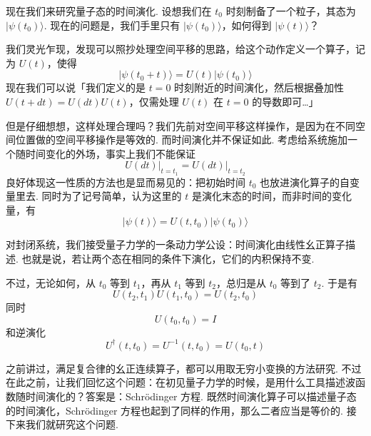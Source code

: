 
​现在我们来研究量子态的时间演化. 设想我们在 \(t_0\) 时刻制备了一个粒子，其态为 \(|\psi(t_0)\rangle\). 现在的问题是，我们手里只有 \(|\psi(t_0)\rangle\)，如何得到 \(|\psi(t)\rangle\)？

​我们灵光乍现，发现可以照抄处理空间平移的思路，给这个动作定义一个算子，记为 \(U(t)\)，使得
\[
|\psi(t_0+t)\rangle=U(t)|\psi(t_0)\rangle
\]
现在我们可以说「我们定义的是 \(t=0\) 时刻附近的时间演化，然后根据叠加性 \(U(t+dt)=U(dt)U(t)\)，仅需处理 \(U(t)\) 在 \(t=0\) 的导数即可…」

但是仔细想想，这样处理合理吗？我们先前对空间平移这样操作，是因为在不同空间位置做的空间平移操作是等效的. 而时间演化并不保证如此. 考虑给系统施加一个随时间变化的外场，事实上我们不能保证
\[
\left.U(dt)\right|_{t=t_1}
=\left.U(dt)\right|_{t=t_2}
\]
良好体现这一性质的方法也是显而易见的：把初始时间 \(t_0\) 也放进演化算子的自变量里去.  同时为了记号简单，认为这里的 \(t\) 是演化末态的时间，而非时间的变化量，有
\[
|\psi(t)\rangle=U(t,t_0)|\psi(t_0)\rangle
\]

\begin{center}

\end{center}

对封闭系统，我们接受量子力学的一条动力学公设：时间演化由线性幺正算子描述. 也就是说，若让两个态在相同的条件下演化，它们的内积保持不变.

​不过，无论如何，从 \(t_0\) 等到 \(t_1\)，再从 \(t_1\) 等到 \(t_2\)，总归是从 \(t_0\) 等到了 \(t_2\). 于是有
\[
U(t_2,t_1)U(t_1,t_0)=U(t_2,t_0)
\]
同时
\[
U(t_0,t_0)=I
\]
和逆演化
\[
U^\dagger(t,t_0)=U^{-1}(t,t_0)=U(t_0,t)
​
\]

之前讲过，满足复合律的幺正连续算子，都可以用取无穷小变换的方法研究. 不过在此之前，让我们回忆这个问题：在初见量子力学的时候，是用什么工具描述波函数随时间演化的？答案是：Schrödinger 方程. 既然时间演化算子可以描述量子态的时间演化，Schrödinger 方程也起到了同样的作用，那么二者应当是等价的. 接下来我们就研究这个问题.


